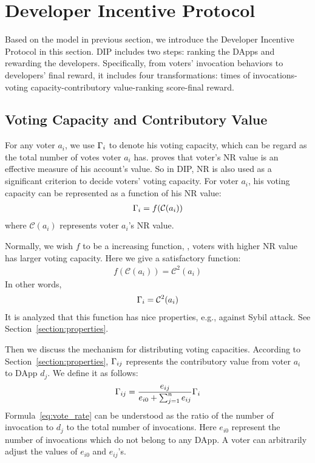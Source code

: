 \section{Developer Incentive Protocol}
Based on the model in previous section, we introduce the Developer Incentive Protocol in this section. DIP includes two steps: ranking the DApps and rewarding the developers. Specifically, from voters' invocation behaviors to developers' final reward, it includes four transformations: times of invocations-voting capacity-contributory value-ranking score-final reward.

\subsection{Voting Capacity and Contributory Value}
For any voter $a_i$, we use $\Gamma_i$ to denote his voting capacity, which can be regard as the total number of votes voter $a_i$ has. \cite{Nebulasyellowpaper} proves that voter's NR value is an effective measure of his account's value. So in DIP, NR is also used as a significant criterion to decide voters' voting capacity. For voter $a_i$, his voting capacity can be represented as a function of his NR value:
\begin{align}
	\Gamma_i = f(\mathcal{C}(a_i))
\end{align}
where $\mathcal{C}(a_i)$ represents voter $a_i$'s NR value.

Normally, we wish $f$ to be a increasing function, \ie, voters with higher NR value has larger voting capacity. Here we give a satisfactory function:
\begin{align}
	f(\mathcal{C}(a_i))=\mathcal{C}^2(a_i)
\end{align}
In other words,
\begin{align}
	\Gamma_i = \mathcal{C}^2(a_i)
\end{align}
It is analyzed that this function has nice properties, e.g., against Sybil attack. See Section~\ref{section:properties}.

Then we discuss the mechanism for  distributing voting capacities. According to Section~\ref{section:properties}, $\Gamma_{ij}$ represents the contributory value from voter $a_i$ to DApp $d_j$. We define it as follows:
\begin{align}
	\label{eq:vote_rate}
	\Gamma_{ij} = \frac{e_{ij}}{e_{i0}+\sum_{j=1}^n {e_{ij}}} \Gamma_i
\end{align}
Formula~\ref{eq:vote_rate} can be understood as the ratio of the number of invocation to $d_j$ to the total number of invocations. Here $e_{i0}$ represent the number of invocations which do not belong to any DApp. A voter can arbitrarily adjust the values of $e_{i0}$ and $e_{ij}$'s.

